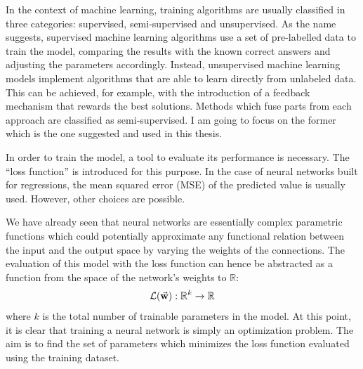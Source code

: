 \documentclass[a4paper,10pt]{report}
\begin{document}

In the context of machine learning, training algorithms are usually classified in three categories: 
supervised, semi-supervised and unsupervised.
As the name suggests, supervised machine learning algorithms use a set of pre-labelled data to 
train the model, comparing the results with the known correct answers and adjusting the parameters 
accordingly.
Instead, unsupervised machine learning models implement algorithms that are able to learn directly from 
unlabeled data. This can be achieved, for example, with the introduction of a feedback mechanism that rewards
the best solutions.
Methods which fuse parts from each approach are classified as semi-supervised. I am going to focus on the
former which is the one suggested and used in this thesis.

In order to train the model, a tool to evaluate its performance is necessary.
The ``loss function'' is introduced for this purpose. In the case of neural networks built for 
regressions, the mean squared error (MSE) of the predicted value
is usually used. However, other choices are possible.

We have already seen that neural networks are essentially complex parametric functions
which could potentially approximate any functional relation between the input and the
output space by varying the weights of the connections. The evaluation of this model
with the loss function can hence be abstracted as a function from the space of the 
network's weights to $\mathbb{R}$:
\begin{equation}
    \mathcal{L}(\va{w}): \mathbb{R}^k \rightarrow \mathbb{R}
\end{equation}
where $k$ is the total number of trainable parameters in the model.
At this point, it is clear that 
training a neural network is simply an optimization problem.
The aim is to find the set of parameters which minimizes the loss function evaluated using 
the training dataset.
\end{document}
